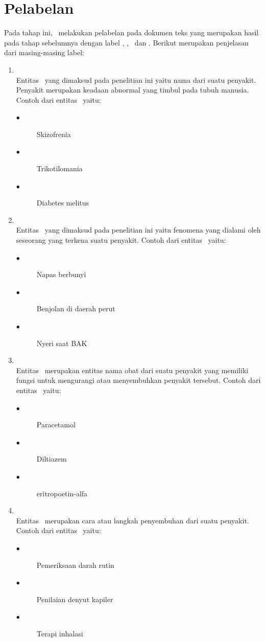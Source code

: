 \section{Pelabelan}
Pada tahap ini, \saya~melakukan pelabelan pada dokumen teks yang merupakan hasil pada tahap sebelumnya dengan label \disease, \symptom, \drug~dan \treatment. Berikut merupakan penjelasan dari masing-masing label:
\begin{enumerate}
	\item \Disease\\
	Entitas \disease~yang dimaksud pada penelitian ini yaitu nama dari suatu penyakit. Penyakit merupakan keadaan abnormal yang timbul pada tubuh manusia. Contoh dari entitas \disease~yaitu:
	\begin{description}
		\item[$\bullet$] Skizofrenia
		\item[$\bullet$] Trikotilomania
		\item[$\bullet$] Diabetes melitus
	\end{description}

	\item \Symptom\\
	Entitas \symptom~yang dimaksud pada penelitian ini yaitu fenomena yang dialami oleh seseorang yang terkena suatu penyakit. Contoh dari entitas \symptom~yaitu:
	\begin{description}
		\item[$\bullet$] Napas berbunyi
		\item[$\bullet$] Benjolan di daerah perut
		\item[$\bullet$] Nyeri saat BAK
	\end{description}

	\item \Drug\\
	Entitas \drug~merupakan entitas nama obat dari suatu penyakit yang memiliki fungsi untuk mengurangi atau menyembuhkan penyakit tersebut. Contoh dari entitas \drug~yaitu:
	\begin{description}
		\item[$\bullet$] Paracetamol
		\item[$\bullet$] Diltiazem
		\item[$\bullet$] eritropoetin-alfa
	\end{description}

	\item \Treatment\\
	Entitas \treatment~merupakan cara atau langkah penyembuhan dari suatu penyakit. Contoh dari entitas \treatment~yaitu:
	\begin{description}
		\item[$\bullet$] Pemeriksaan darah rutin
		\item[$\bullet$] Penilaian denyut kapiler
		\item[$\bullet$] Terapi inhalasi
	\end{description}


\end{enumerate}
